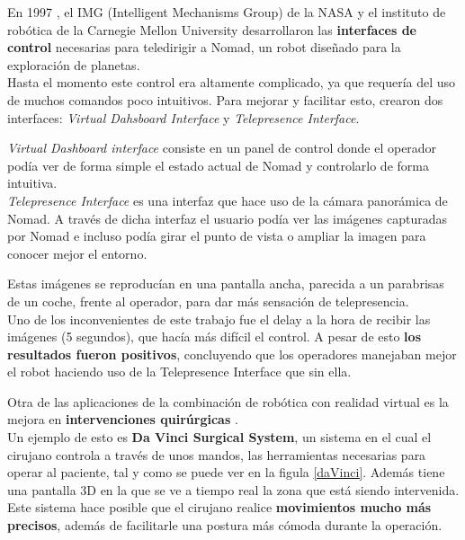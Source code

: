 \documentclass[twoside, 11pt]{epstfg}
\begin{document}
En 1997 , el IMG (Intelligent Mechanisms Group) de la NASA y el instituto de robótica de la Carnegie Mellon University desarrollaron las \textbf{interfaces de control} necesarias para teledirigir a Nomad, un robot diseñado para la exploración de planetas. \cite{Nguyen2001}\\
Hasta el momento este control era altamente complicado, ya que requería del uso de muchos comandos poco intuitivos. Para mejorar y facilitar esto, crearon dos interfaces:\textit{ Virtual Dahsboard Interface} y \textit{Telepresence Interface}.

\textit{Virtual Dashboard interface} consiste en un panel de control donde el operador podía ver de forma simple el estado actual de Nomad y controlarlo de forma intuitiva.\\
\textit{Telepresence Interface} es una interfaz que hace uso de la cámara panorámica de Nomad. A través de dicha interfaz el usuario podía ver las imágenes capturadas por Nomad e incluso podía girar el punto de vista o ampliar la imagen para conocer mejor el entorno.

Estas imágenes se reproducían en una pantalla ancha, parecida a un parabrisas de un coche, frente al operador, para dar más sensación de telepresencia.\\
Uno de los inconvenientes de este trabajo fue el delay a la hora de recibir las imágenes (5 segundos), que hacía más difícil el control.
A pesar de esto \textbf{los resultados fueron positivos}, concluyendo que los operadores manejaban mejor el robot haciendo uso de la Telepresence Interface que sin ella.

Otra de las aplicaciones de la combinación de robótica con realidad virtual es la mejora en \textbf{intervenciones quirúrgicas} \cite{connolly2014validation}.\\
Un ejemplo de esto es \textbf{Da Vinci Surgical System}, un sistema en el cual el cirujano controla a través de unos mandos, las herramientas necesarias para operar al paciente, tal y como se puede ver en la figula \ref{daVinci}. Además tiene una pantalla 3D en la que se ve a tiempo real la zona que está siendo intervenida.
Este sistema hace posible que el cirujano realice \textbf{movimientos mucho más precisos}, además de facilitarle una postura más cómoda durante la operación. \cite{Hubens2003}
\end{document}
